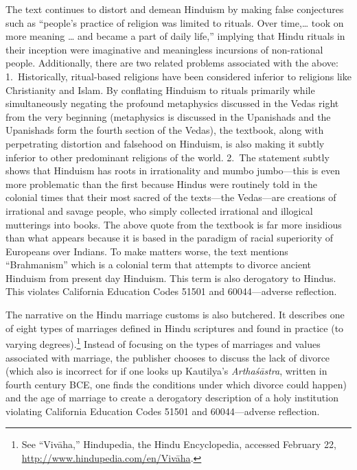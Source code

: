 The text continues to distort and demean Hinduism by making false conjectures such as “people’s practice of religion was limited to rituals. Over time,… took on more meaning … and became a part of daily life,” implying that Hindu rituals in their inception were imaginative and meaningless incursions of non-rational people. Additionally, there are two related problems associated with the above: 1.\ Historically, ritual-based religions have been considered inferior to religions like Christianity and Islam. By conflating Hinduism to rituals primarily while simultaneously negating the profound metaphysics discussed in the Vedas right from the very beginning (metaphysics is discussed in the Upanishads and the Upanishads form the fourth section of the Vedas), the textbook, along with perpetrating distortion and falsehood on Hinduism, is also making it subtly inferior to other predominant religions of the world. 2.\ The statement subtly shows that Hinduism has roots in irrationality and mumbo jumbo—this is even more problematic than the first because Hindus were routinely told in the colonial times that their most sacred of the texts—the Vedas—are creations of irrational and savage people, who simply collected irrational and illogical mutterings into books. The above quote from the textbook is far more insidious than what appears because it is based in the paradigm of racial superiority of Europeans over Indians. To make matters worse, the text mentions “Brahmanism” which is a colonial term that attempts to divorce ancient Hinduism from present day Hinduism. This term is also derogatory to Hindus. This violates California Education Codes 51501 and 60044—adverse reflection.  

The narrative on the Hindu marriage customs is also butchered. It describes one of eight types of marriages defined in Hindu scriptures and found in practice (to varying degrees).\footnote{See “Vivāha,” Hindupedia, the Hindu Encyclopedia, accessed 	February 22, \url{http://www.hindupedia.com/en/Vivāha}.} Instead of focusing on the types of marriages and values associated with marriage, the publisher chooses to discuss the lack of divorce (which also is incorrect for if one looks up Kautilya’s \textit{Arthaśāstra}, written in fourth century BCE, one finds the conditions under which divorce could happen) and the age of marriage to create a derogatory description of a holy institution violating California Education Codes 51501 and 60044—adverse reflection.  

